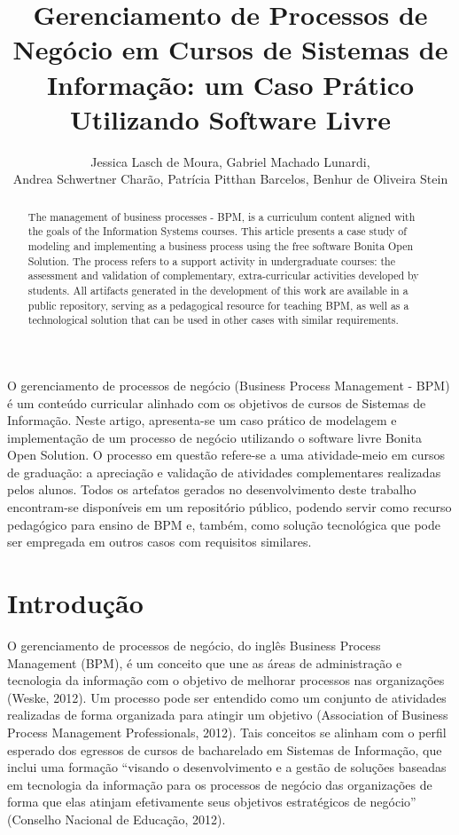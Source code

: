 \documentclass[12pt]{article}
\title{Gerenciamento de Processos de Negócio em Cursos de Sistemas de Informação: um Caso Prático Utilizando Software Livre}
\author{Jessica Lasch de Moura\inst{1}, Gabriel Machado Lunardi\inst{1},\\
Andrea Schwertner Charão\inst{1}, Patrícia Pitthan Barcelos\inst{1}, Benhur de Oliveira Stein\inst{1}}
\begin{document}
\maketitle


\begin{resumo}
O gerenciamento de processos de negócio (Business Process Management - BPM) é um conteúdo curricular alinhado com os objetivos de cursos de Sistemas de Informação. Neste artigo, apresenta-se um caso prático de modelagem e implementação de um processo de negócio utilizando o software livre Bonita Open Solution. O processo em questão refere-se a uma atividade-meio em cursos de graduação: a apreciação e validação de atividades complementares realizadas pelos alunos. Todos os artefatos gerados no desenvolvimento deste trabalho encontram-se disponíveis em um repositório público, podendo servir como recurso pedagógico para ensino de BPM e, também, como solução tecnológica que pode ser empregada em outros casos com requisitos similares.
\end{resumo}


\begin{abstract}
The management of business processes - BPM, is a curriculum content aligned with the goals of the Information Systems courses. This article presents a case study of modeling and implementing a business process using the free software Bonita Open Solution. The process refers to a support activity in undergraduate courses: the assessment and validation of complementary, extra-curricular activities developed by students. All artifacts generated in the development of this work are available in a public repository, serving as a pedagogical resource for teaching BPM, as well as a technological solution that can be used in other cases with similar requirements.
\end{abstract}


\section{Introdução}

O gerenciamento de processos de negócio, do inglês Business Process Management (BPM), é um conceito que une as áreas de administração e tecnologia da informação com o objetivo de melhorar processos nas organizações (Weske, 2012). Um processo pode ser entendido como um conjunto de atividades realizadas de forma organizada para atingir um objetivo (Association of Business Process Management Professionals, 2012). Tais conceitos se alinham com o perfil esperado dos egressos de cursos de bacharelado em Sistemas de Informação, que inclui uma formação “visando o desenvolvimento e a gestão de soluções baseadas em tecnologia da informação para os processos de negócio das organizações de forma que elas atinjam efetivamente seus objetivos estratégicos de negócio” (Conselho Nacional de Educação, 2012).
\end{document}
